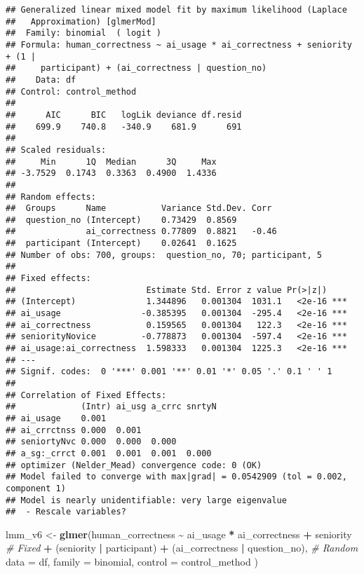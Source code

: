 \documentclass[
]{article}
\newenvironment{Shaded}{\begin{snugshade}}{\end{snugshade}}
\newcommand{\AttributeTok}[1]{\textcolor[rgb]{0.13,0.29,0.53}{#1}}
\newcommand{\CommentTok}[1]{\textcolor[rgb]{0.56,0.35,0.01}{\textit{#1}}}
\newcommand{\FunctionTok}[1]{\textcolor[rgb]{0.13,0.29,0.53}{\textbf{#1}}}
\newcommand{\NormalTok}[1]{#1}
\newcommand{\OtherTok}[1]{\textcolor[rgb]{0.56,0.35,0.01}{#1}}
\newcommand{\SpecialCharTok}[1]{\textcolor[rgb]{0.81,0.36,0.00}{\textbf{#1}}}
\begin{document}
\begin{verbatim}
## Generalized linear mixed model fit by maximum likelihood (Laplace
##   Approximation) [glmerMod]
##  Family: binomial  ( logit )
## Formula: human_correctness ~ ai_usage * ai_correctness + seniority + (1 |  
##     participant) + (ai_correctness | question_no)
##    Data: df
## Control: control_method
## 
##      AIC      BIC   logLik deviance df.resid 
##    699.9    740.8   -340.9    681.9      691 
## 
## Scaled residuals: 
##     Min      1Q  Median      3Q     Max 
## -3.7529  0.1743  0.3363  0.4900  1.4336 
## 
## Random effects:
##  Groups      Name           Variance Std.Dev. Corr 
##  question_no (Intercept)    0.73429  0.8569        
##              ai_correctness 0.77809  0.8821   -0.46
##  participant (Intercept)    0.02641  0.1625        
## Number of obs: 700, groups:  question_no, 70; participant, 5
## 
## Fixed effects:
##                          Estimate Std. Error z value Pr(>|z|)    
## (Intercept)              1.344896   0.001304  1031.1   <2e-16 ***
## ai_usage                -0.385395   0.001304  -295.4   <2e-16 ***
## ai_correctness           0.159565   0.001304   122.3   <2e-16 ***
## seniorityNovice         -0.778873   0.001304  -597.4   <2e-16 ***
## ai_usage:ai_correctness  1.598333   0.001304  1225.3   <2e-16 ***
## ---
## Signif. codes:  0 '***' 0.001 '**' 0.01 '*' 0.05 '.' 0.1 ' ' 1
## 
## Correlation of Fixed Effects:
##             (Intr) ai_usg a_crrc snrtyN
## ai_usage    0.001                      
## ai_crrctnss 0.000  0.001               
## seniortyNvc 0.000  0.000  0.000        
## a_sg:_crrct 0.001  0.001  0.001  0.000 
## optimizer (Nelder_Mead) convergence code: 0 (OK)
## Model failed to converge with max|grad| = 0.0542909 (tol = 0.002, component 1)
## Model is nearly unidentifiable: very large eigenvalue
##  - Rescale variables?
\end{verbatim}

\begin{Shaded}
\begin{Highlighting}[]
\NormalTok{lmm\_v6 }\OtherTok{\textless{}{-}} \FunctionTok{glmer}\NormalTok{(human\_correctness }\SpecialCharTok{\textasciitilde{}}\NormalTok{ ai\_usage }\SpecialCharTok{*}\NormalTok{ ai\_correctness }\SpecialCharTok{+}\NormalTok{ seniority }\CommentTok{\# Fixed}
                \SpecialCharTok{+}\NormalTok{ (seniority }\SpecialCharTok{|}\NormalTok{ participant) }\SpecialCharTok{+}\NormalTok{ (ai\_correctness }\SpecialCharTok{|}\NormalTok{ question\_no), }\CommentTok{\# Random}
                \AttributeTok{data =}\NormalTok{ df, }\AttributeTok{family =}\NormalTok{ binomial,}
                \AttributeTok{control =}\NormalTok{ control\_method}
\NormalTok{                )}
\end{Highlighting}
\end{Shaded}
\end{document}
